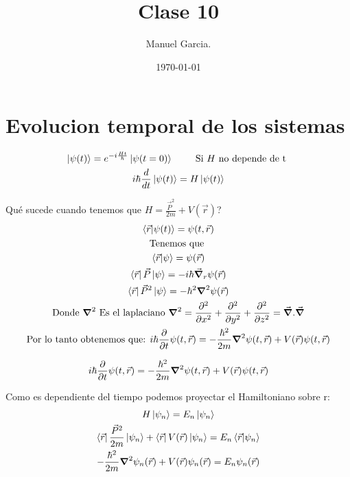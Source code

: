\documentclass{article}
\title{Clase 10 }
\author{Manuel Garcia.}
\date{\today}
\newcommand{\caja}[3]{%
  \begin{tcolorbox}[colback=#1!5!white,colframe=#1!25!black,title=#2]
    #3
  \end{tcolorbox}%
}
\begin{document}
\maketitle

\section{Evolucion temporal de los sistemas }
\caja{green}{Evolucion temporal }{
  \begin{gather*}
    \ket{\psi(t)} = e ^ {-i \frac{Ht }{\hbar }}\ket{\psi(t=0 )}\qquad \text{ Si }H \text{ no depende de t }\\
    i \hbar \frac{d  }{d t }\ket{\psi(t) } = H \ket{\psi(t) }
  \end{gather*}
}

Qué sucede cuando tenemos que $ H = \frac{\vec P ^2}{2m } + V(\vec r ) $?
\begin{gather*}
  \bra{\vec r }\ket{\psi(t) } = \psi(t, \vec r )  \\
  \text{Tenemos que }\\
  \bra{\vec r }\ket{\psi} = \psi(\vec r ) \\
  \bra{\vec r }\vec P \ket{\psi } = -i \hbar \vec \grad_r \psi(\vec r )\\
  \bra{\vec r }\vec P ^2\ket{\psi} = - \hbar ^2 \grad ^2 \psi(\vec r )\\
  \text{Donde }\grad ^2 \text{ Es el laplaciano } \grad ^2 = \frac{\partial ^2 }{\partial x ^2} + \frac{\partial ^2 }{\partial y ^2} + \frac{\partial ^2 }{\partial z ^2  } = \vec \grad . \vec \grad \\
  \text{Por lo tanto obtenemos que: }
  i \hbar \frac{\partial  }{\partial t }\psi (t, \vec r ) = - \frac{\hbar ^2}{2m }\grad ^2 \psi(t, \vec r ) + V(\vec r ) \psi(t, \vec r )
\end{gather*}

\caja{red}{Ecuacion de schrodinger \textbf{dependiente} del tiempo }{
  \begin{gather*}
    i \hbar \frac{\partial  }{\partial t }\psi (t, \vec r ) = - \frac{\hbar ^2}{2m }\grad ^2 \psi(t, \vec r ) + V(\vec r ) \psi(t, \vec r ) 
  \end{gather*}
}

Como es dependiente del tiempo podemos proyectar el Hamiltoniano sobre r: 
\begin{gather*}
  H \ket{\psi_n } = E_n \ket{\psi_n }\\
  \bra{\vec r }\frac{\vec P ^2}{2m }\ket{\psi_n } + \bra{\vec r }V(\vec r )\ket{\psi_n } = E_n \bra{\vec r }\ket{\psi _n }\\
  - \frac{\hbar  ^2}{2m }\grad ^2 \psi_n (\vec r ) + V(\vec r) \psi_n(\vec r ) = E_n \psi_n (\vec r )
\end{gather*}
\end{document}
